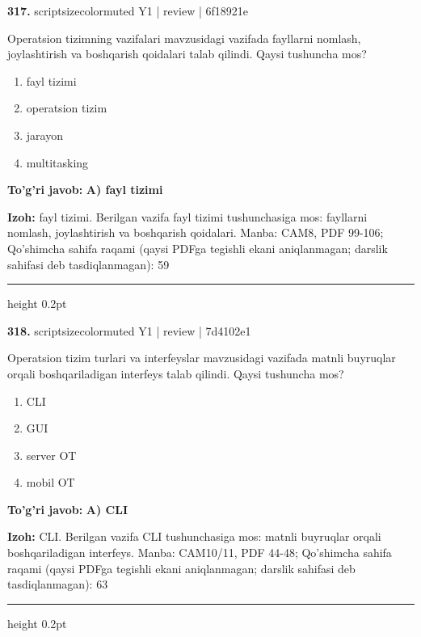 \documentclass[10pt,a4paper]{article}
\begin{document}
{\bfseries\sffamily\color{ink} 317.} {scriptsizecolor{muted} Y1 | review | 6f18921e}
\par
Operatsion tizimning vazifalari mavzusidagi vazifada fayllarni nomlash, joylashtirish va boshqarish qoidalari talab qilindi. Qaysi tushuncha mos?
\begin{enumerate}[label=\Alph*),leftmargin=9mm]
\item fayl tizimi
\item operatsion tizim
\item jarayon
\item multitasking
\end{enumerate}
\begin{tcolorbox}[enhanced,breakable,colback=teal!4,colframe=teal!60!black,boxrule=0.45pt,arc=1.2mm,left=2.7mm,right=2.7mm,top=1.8mm,bottom=1.8mm,before skip=2mm,after skip=2mm]
{\bfseries\sffamily\color{teal}To'g'ri javob:} \textbf{A) fayl tizimi}
\par\smallskip
{\bfseries Izoh:} fayl tizimi. Berilgan vazifa fayl tizimi tushunchasiga mos: fayllarni nomlash, joylashtirish va boshqarish qoidalari. Manba: CAM8, PDF 99-106; Qo'shimcha sahifa raqami (qaysi PDFga tegishli ekani aniqlanmagan; darslik sahifasi deb tasdiqlanmagan): 59
\end{tcolorbox}
\vspace{2mm}\hrule height 0.2pt\vspace{3mm}

{\bfseries\sffamily\color{ink} 318.} {scriptsizecolor{muted} Y1 | review | 7d4102e1}
\par
Operatsion tizim turlari va interfeyslar mavzusidagi vazifada matnli buyruqlar orqali boshqariladigan interfeys talab qilindi. Qaysi tushuncha mos?
\begin{enumerate}[label=\Alph*),leftmargin=9mm]
\item CLI
\item GUI
\item server OT
\item mobil OT
\end{enumerate}
\begin{tcolorbox}[enhanced,breakable,colback=teal!4,colframe=teal!60!black,boxrule=0.45pt,arc=1.2mm,left=2.7mm,right=2.7mm,top=1.8mm,bottom=1.8mm,before skip=2mm,after skip=2mm]
{\bfseries\sffamily\color{teal}To'g'ri javob:} \textbf{A) CLI}
\par\smallskip
{\bfseries Izoh:} CLI. Berilgan vazifa CLI tushunchasiga mos: matnli buyruqlar orqali boshqariladigan interfeys. Manba: CAM10/11, PDF 44-48; Qo'shimcha sahifa raqami (qaysi PDFga tegishli ekani aniqlanmagan; darslik sahifasi deb tasdiqlanmagan): 63
\end{tcolorbox}
\vspace{2mm}\hrule height 0.2pt\vspace{3mm}
\end{document}
